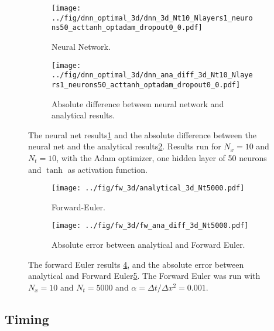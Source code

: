 \begin{figure}[h!tb]
    \centering
    \begin{subfigure}{0.5\textwidth}
        \centering
        \texttt{[image: ../fig/dnn\_optimal\_3d/dnn\_3d\_Nt10\_Nlayers1\_neurons50\_acttanh\_optadam\_dropout0\_0.pdf]}
        \caption{Neural Network.}
        \label{fig:neural-net-optimal-3d}
    \end{subfigure}
    \begin{subfigure}{0.5\textwidth}
        \centering
        \texttt{[image: ../fig/dnn\_optimal\_3d/dnn\_ana\_diff\_3d\_Nt10\_Nlayers1\_neurons50\_acttanh\_optadam\_dropout0\_0.pdf]}
        \caption{Absolute difference between neural network and analytical results.}
        \label{fig:dnn-ana-diff-3d}
    \end{subfigure}
    \caption{The neural net results\ref{fig:neural-net-optimal-3d} and the absolute difference between the neural net and the analytical results\ref{fig:dnn-ana-diff-3d}. Results run for $N_x=10$ and $N_t=10$, with the Adam optimizer, one hidden layer of 50 neurons and $\tanh$ as activation function.}
    \label{fig:3d-dnn-comparison-plots}
\end{figure}

\begin{figure}[h!tb]
    \centering
    \begin{subfigure}{0.5\textwidth}
        \centering
        \texttt{[image: ../fig/fw\_3d/analytical\_3d\_Nt5000.pdf]}
        \caption{Forward-Euler.}
        \label{fig:fw-3d}
    \end{subfigure}
    \begin{subfigure}{0.5\textwidth}
        \centering
        \texttt{[image: ../fig/fw\_3d/fw\_ana\_diff\_3d\_Nt5000.pdf]}
        \caption{Absolute error between analytical and Forward Euler.}
        \label{fig:fw-ana-diff-3d}
    \end{subfigure}
    \caption{The forward Euler results \ref{fig:fw-3d}, and the absolute error between analytical and Forward Euler\ref{fig:fw-ana-diff-3d}. The Forward Euler was run with $N_x=10$ and $N_t=5000$ and $\alpha=\Delta t / \Delta x^2=0.001$.}
    \label{fig:3d-fw-comparison-plots}
\end{figure}


\subsection{Timing}
